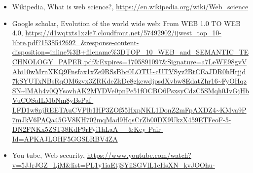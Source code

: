 \documentclass[12pt]{article}
\begin{document}
\begin{itemize}
    \item {Wikipedia, What is web science?, \url{https://en.wikipedia.org/wiki/Web_science}}
    \item{Google scholar,  Evolution of the world wide web: From WEB 1.0 TO WEB 4.0, \url{https://d1wqtxts1xzle7.cloudfront.net/57492902/ijwest_top_10-libre.pdf?1538542692=&response-content-disposition=inline%3B+filename%3DTOP_10_WEB_and_SEMANTIC_TECHNOLOGY_PAPER.pdf&Expires=1705891097&Signature=a7LeWE98gvVAbi10wMrnXKQ9Fnsfax1xZe9RSsBbc0LOTU~cUTVSyz2BtCEaJDR0hHrjjd7kSYUTxNBsRqOM6zvx3ZRKdeZkDe8gkcwdjpsdXvbw8EdatZhr16~FyOHqzSN~lMAh4v0QYsovhAK2MYDVe0pnPe51fOCBO6PsxsyCdzC5SMqh0JvGjHbVuCOSaILMbNm8yBsPaf-LFD1w8njREETAuCVPlb1HP3ZOf55HxpNKL1DonZ2mFpAXDZ4~KMva9P7mJkV6PAQa45GV8KH702mqMad9HqsCrZb00DX9UkzX459ETFeoF-5-DN2FNKx5ZST38KdP9rFyi1hLaA__&Key-Pair-Id=APKAJLOHF5GGSLRBV4ZA}}
     \item {You tube, Web security, \url{https://www.youtube.com/watch?v=5JJrJGZ_LjM&list=PL1y1iaEtjSYiiSGVlL1cHsXN_kvJOOhu-}}
\end{itemize}
\end{document}

